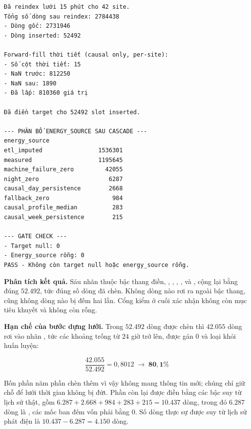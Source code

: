 \begingroup
\par{}\vspace{8pt}
\small\renewcommand{\baselinestretch}{1.0}\selectfont
\begin{verbatim}
Đã reindex lưới 15 phút cho 42 site.
Tổng số dòng sau reindex: 2784438
- Dòng gốc: 2731946
- Dòng inserted: 52492

Forward-fill thời tiết (causal only, per-site):
- Số cột thời tiết: 15
- NaN trước: 812250
- NaN sau: 1890
- Đã lấp: 810360 giá trị

Đã điền target cho 52492 slot inserted.

--- PHÂN BỐ ENERGY_SOURCE SAU CASCADE ---
energy_source
etl_imputed                1536301
measured                   1195645
machine_failure_zero         42055
night_zero                    6287
causal_day_persistence        2668
fallback_zero                  984
causal_profile_median          283
causal_week_persistence        215

--- GATE CHECK ---
- Target null: 0
- Energy_source rỗng: 0
PASS - Không còn target null hoặc energy_source rỗng.
\end{verbatim}
\par\vspace{8pt}
\endgroup
\textbf{Phân tích kết quả.} Sáu nhãn thuộc bậc thang điền, ,
, , ,
 và , cộng lại bằng đúng
$52.492$, tức đúng số dòng đã chèn. Không dòng nào rơi ra ngoài bậc thang, cũng không dòng
nào bị đếm hai lần. Cổng kiểm ở cuối xác nhận không còn mục tiêu khuyết và không còn
 rỗng.

\textbf{Hạn chế của bước dựng lưới.} Trong $52.492$ dòng được chèn thì $42.055$ dòng rơi vào
nhãn , tức các khoảng trống từ $24$ giờ trở lên, được gán $0$ và
loại khỏi huấn luyện:

\begin{equation}
\frac{42.055}{52.492} = 0{,}8012 \;\longrightarrow\; \mathbf{80{,}1\%}
\end{equation}

Bốn phần năm phần chèn thêm vì vậy không mang thông tin mới; chúng chỉ giữ chỗ để
lưới thời gian không bị đứt. Phần còn lại được điền bằng các bậc suy từ lịch sử thật, gồm
$6.287 + 2.668 + 984 + 283 + 215 = 10.437$ dòng, trong đó $6.287$ dòng là 
, các mốc ban đêm vốn phải bằng $0$. Số dòng thực sự được suy từ lịch sử phát điện là
$10.437 - 6.287 = \mathbf{4.150}$ dòng.

